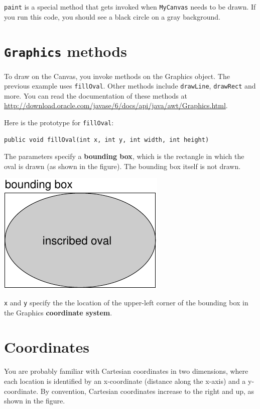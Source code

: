 {\tt paint} is a special method that gets invoked
when {\tt MyCanvas} needs to be drawn.
If you run this code, you should see a black circle on a gray
background.


\section{{\tt Graphics} methods}

To draw on the Canvas, you invoke methods on the
Graphics object.  The previous example uses {\tt fillOval}.
Other methods include {\tt drawLine}, {\tt drawRect} and more.
You can read the documentation of these methods at
\url{http://download.oracle.com/javase/6/docs/api/java/awt/Graphics.html}.

Here is the prototype for {\tt fillOval}:

\begin{lstlisting}
public void fillOval(int x, int y, int width, int height)
\end{lstlisting}

The parameters specify
a {\bf bounding box}, which is the rectangle
in which the oval is drawn (as shown in the figure).  The
bounding box itself is not drawn.



\includegraphics{figs/circle.pdf}

{\tt x} and {\tt y} specify the
the location of the upper-left corner
of the bounding box in the Graphics
{\bf coordinate system}.


\section{Coordinates}

You are probably familiar with Cartesian coordinates in two
dimensions, where each location is identified by an x-coordinate
(distance along the x-axis) and a y-coordinate.  By convention,
Cartesian coordinates increase to the right and up, as shown in the
figure.



